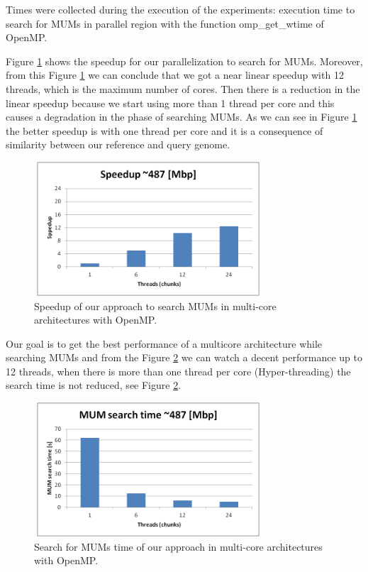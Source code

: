 \documentclass[conference]{IEEEtran}
\begin{document}
Times were collected during the execution of the experiments: execution time to search for MUMs in parallel region with the function omp\_get\_wtime of OpenMP.

Figure \ref{fig:speedup} shows the speedup for our parallelization to search for MUMs. Moreover, from this Figure \ref{fig:speedup} we can conclude that we got a near linear speedup with 12 threads, which is the maximum number of cores. Then there is a reduction in the linear speedup because we start using more than 1 thread per core and this causes a degradation in the phase of searching MUMs. As we can see in Figure \ref{fig:speedup} the better speedup is with one thread per core and it is a consequence of similarity between our reference and query genome.

\begin{figure}[htb]
  \centering
  \includegraphics[width=8.5cm,height=5cm]{speedup-big.png}
  \caption{Speedup of our approach to search MUMs in multi-core architectures with OpenMP.}
  \label{fig:speedup}
 \end{figure}  
 
Our goal is to get the best performance of a multicore architecture while searching MUMs and from the Figure \ref{fig:time} we can watch a decent performance up to 12 threads, when there is more than one thread per core (Hyper-threading) the search time is not reduced, see Figure \ref{fig:time}.

\begin{figure}[htb]
  \centering
  \includegraphics[width=8.5cm,height=5cm]{time.png}
  \caption{Search for MUMs time of our approach in multi-core architectures with OpenMP.}
  \label{fig:time}
 \end{figure}  
\end{document}
